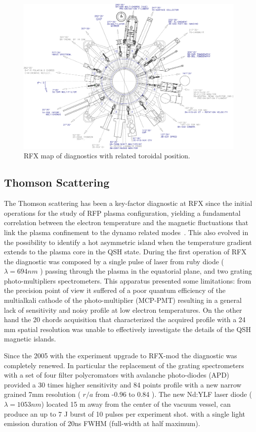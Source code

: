 %
\begin{figure}[ht!]
\includegraphics[width=1\textwidth]{img/rfx/Layout_Diagnosiche_AA10005.eps} \centering
\caption{RFX map of diagnostics with related toroidal position.}
\label{rfx}
\end{figure}
%

\subsection{Thomson Scattering}
The Thomson scattering  has been a key-factor diagnostic at RFX since the initial operations for the study of RFP plasma configuration, yielding a fundamental correlation between the electron temperature and the magnetic fluctuations that link the plasma confinement to the dynamo related modes~\cite{}. This also evolved in the possibility to identify a hot asymmetric island when the temperature gradient extends to the plasma core in the \ac{QSH} state.
During the first operation of RFX the diagnostic was composed by a single pulse of laser from ruby diode ( $\lambda = 694 nm$ ) passing through the plasma in the equatorial plane, and two grating photo-multipliers spectrometers.
This apparatus presented some limitations: from the precision point of view it suffered of a poor quantum efficiency of the multialkali cathode of the photo-multiplier (MCP-PMT) resulting in a general lack of sensitivity and noisy profile at low electron temperatures. On the other hand the 20 chords acquisition that characterized the acquired profile with a 24 mm spatial resolution was unable to effectively investigate the details of the QSH magnetic islands.

Since the 2005 with the experiment upgrade to RFX-mod the diagnostic was completely renewed. In particular the replacement of the grating spectrometers with a set of four filter polycromators with avalanche photo-diodes (APD) provided a 30 times higher sensitivity and 84 points profile with a new narrow grained 7mm resolution ( $r/a$ from -0.96 to 0.84 ).
The new Nd:YLF laser diode ($\lambda=1053 nm$) located 15 m away from the center of the vacuum vessel, can produce an up to 7 J burst of 10 pulses per experiment shot. with a single light emission duration of 20ns FWHM (full-width at half maximum).

